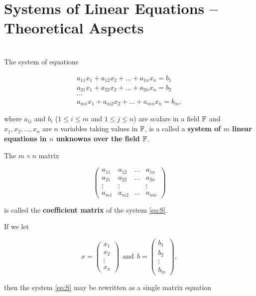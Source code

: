 \section{Systems of Linear Equations -- Theoretical Aspects}

\begin{definition}
	\hfill\\
	The system of equations

	\begin{equation}\label{eq:S}
		\tag{S}
		\begin{split}
			a_{11}x_1 + a_{12}x_2 + \dots + a_{1n}x_n = b_1\\
			a_{21}x_1 + a_{22}x_2 + \dots + a_{2n}x_n = b_2\\
			\dots \\
			a_{m1}x_1 + a_{m2}x_2 + \dots + a_{mn}x_n = b_m,
		\end{split}
	\end{equation}

	where $a_{ij}$ and $b_i$ ($1 \leq i \leq m$ and $1 \leq j \leq n$) are scalars in a field $\mathbb{F}$ and $x_1, x_2, \dots, x_n$ are $n$ variables taking values in $\mathbb{F}$, is a called a \textbf{system of $m$ linear equations in $n$ unknowns over the field $\mathbb{F}$}.

	The $m \times n$ matrix

	\[\begin{pmatrix}
			a_{11} & a_{12} & \dots & a_{1n} \\
			a_{21} & a_{22} & \dots & a_{2n} \\
			\vdots & \vdots &       & \vdots \\
			a_{m1} & a_{m2} & \dots & a_{mn}
		\end{pmatrix}\]

	is called the \textbf{coefficient matrix} of the system \eqref{eq:S}.

	If we let

	\[x = \begin{pmatrix}
			x_1 \\ x_2 \\ \vdots \\ x_n
		\end{pmatrix}\ \ \text{and}\ \ b = \begin{pmatrix}
			b_1 \\ b_2 \\ \vdots \\ b_m
		\end{pmatrix},\]

	then the system \eqref{eq:S} may be rewritten as a single matrix equation


\end{definition}
